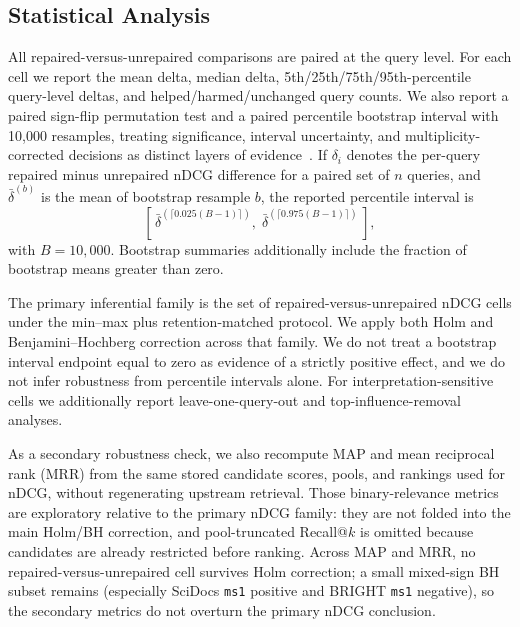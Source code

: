 \documentclass[manuscript,anonymous,review]{acmart}
\begin{document}
\subsection{Statistical Analysis}
\label{sec:bootstrap}

All repaired-versus-unrepaired comparisons are paired at the query level. For
each cell we report the mean delta, median delta, 5th/25th/75th/95th-percentile
query-level deltas, and helped/harmed/unchanged query counts. We also report a
paired sign-flip permutation test and a paired percentile bootstrap interval
with 10{,}000 resamples, treating significance, interval uncertainty, and
multiplicity-corrected decisions as distinct layers of
evidence~\cite{urbano2019statistical}. If $\delta_i$ denotes the per-query repaired minus
unrepaired nDCG difference for a paired set of $n$ queries, and
$\bar{\delta}^{(b)}$ is the mean of bootstrap resample $b$, the reported
percentile interval is
\begin{equation}
  \left[\, \bar\delta^{(\lceil 0.025(B-1)\rceil)},\; \bar\delta^{(\lceil 0.975(B-1)\rceil)} \,\right],
  \label{eq:bootstrap-ci}
\end{equation}
with $B=10{,}000$. Bootstrap summaries additionally include the fraction of
bootstrap means greater than zero.

The primary inferential family is the set of repaired-versus-unrepaired nDCG
cells under the min--max plus retention-matched protocol. We apply both Holm
and Benjamini--Hochberg correction across that family. We do not treat a
bootstrap interval endpoint equal to zero as evidence of a strictly positive
effect, and we do not infer robustness from percentile intervals alone. For
interpretation-sensitive cells we additionally report leave-one-query-out and
top-influence-removal analyses.

As a secondary robustness check, we also recompute MAP and mean reciprocal
rank (MRR) from the same stored candidate scores, pools, and rankings used for
nDCG, without regenerating upstream retrieval. Those binary-relevance metrics
are exploratory relative to the primary nDCG family: they are not folded into
the main Holm/BH correction, and pool-truncated Recall@$k$ is omitted because
candidates are already restricted before ranking. Across MAP and MRR, no
repaired-versus-unrepaired cell survives Holm correction; a small mixed-sign BH
subset remains (especially SciDocs \texttt{ms1} positive and BRIGHT
\texttt{ms1} negative), so the secondary metrics do not overturn the primary
nDCG conclusion.
\end{document}
